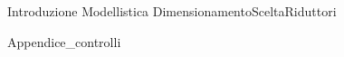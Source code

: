 \documentclass{miaclasse}
\begin{document}
\primapag

\pagestyle{fancy}







{Introduzione}
{Modellistica}
{DimensionamentoSceltaRiduttori}

\appendix
{Appendice_controlli}
\end{document}
